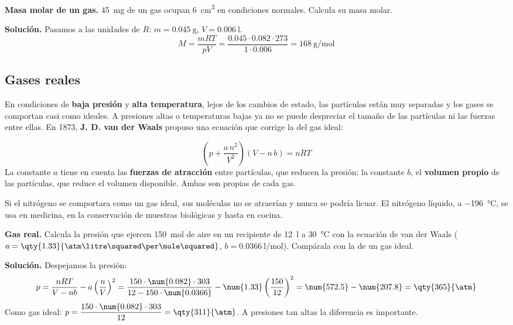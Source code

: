 \begin{example}
    \textbf{Masa molar de un gas.} \qty{45}{\milli\gram} de un gas ocupan \qty{6}{\cubic\centi\metre} en condiciones normales.
    Calcula su masa molar.

    \textbf{Solución.} Pasamos a las unidades de \(R\): \(m = \qty{0.045}{\gram}\), \(V = \qty{0.006}{\litre}\).
    \[ M = \frac{m R T}{p V} = \frac{\num{0.045} \cdot \num{0.082} \cdot 273}{1 \cdot \num{0.006}} = \qty{168}{\gram\per\mole} \]
\end{example}

\subsection{Gases reales}

En condiciones de \textbf{baja presión} y \textbf{alta temperatura}, lejos de los cambios de estado, las partículas están muy
separadas y los gases se comportan casi como ideales. A presiones altas o temperaturas bajas ya no se puede despreciar el
tamaño de las partículas ni las fuerzas entre ellas. En 1873, \textbf{J. D. van der Waals} propuso una ecuación que corrige la
del gas ideal:

\begin{definition}
    \[ \left(p + \frac{a\,n^2}{V^2}\right)\left(V - n\,b\right) = n R T \]
    La constante \(a\) tiene en cuenta las \textbf{fuerzas de atracción} entre partículas, que reducen la presión; la constante
    \(b\), el \textbf{volumen propio} de las partículas, que reduce el volumen disponible. Ambas son propias de cada gas.
\end{definition}

\begin{remark}
    Si el nitrógeno se comportara como un gas ideal, sus moléculas no se atraerían y nunca se podría licuar. El nitrógeno
    líquido, a \qty{-196}{\degreeCelsius}, se usa en medicina, en la conservación de muestras biológicas y hasta en cocina.
\end{remark}

\begin{example}
    \textbf{Gas real.} Calcula la presión que ejercen \qty{150}{\mole} de aire en un recipiente de \qty{12}{\litre} a
    \qty{30}{\degreeCelsius} con la ecuación de van der Waals (\(a = \qty{1.33}{\atm\litre\squared\per\mole\squared}\),
    \(b = \qty{0.0366}{\litre\per\mole}\)). Compárala con la de un gas ideal.

    \textbf{Solución.} Despejamos la presión:
    \[ p = \frac{n R T}{V - n b} - a \left(\frac{n}{V}\right)^2 = \frac{150 \cdot \num{0.082} \cdot 303}{12 - 150 \cdot \num{0.0366}}
    - \num{1.33} \left(\frac{150}{12}\right)^2 = \num{572.5} - \num{207.8} = \qty{365}{\atm} \]
    Como gas ideal: \(p = \dfrac{150 \cdot \num{0.082} \cdot 303}{12} = \qty{311}{\atm}\). A presiones tan altas la diferencia es
    importante.
\end{example}

